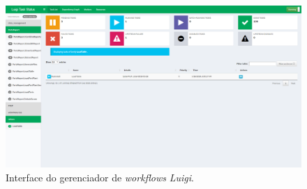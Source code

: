 \begin{figure}[!t]
    \centering
    \includegraphics[width=\linewidth, clip=true, trim=0 400px 0 0]{Imagens/Luigi_GUI}
    \caption{Interface do gerenciador de \textit{workflows} \textit{Luigi}.}
    \label{fig:luigi}
\end{figure}







